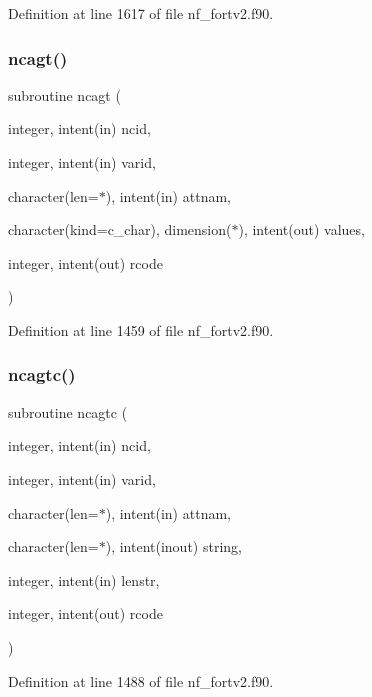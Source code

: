 Definition at line 1617 of file nf\+\_\+fortv2.\+f90.

\mbox{\label{nf__fortv2_8f90_a12c954aa7ec21768adf357a69850aa8e}} 
\subsubsection{\texorpdfstring{ncagt()}{ncagt()}}
{\footnotesize\ttfamily subroutine ncagt (\begin{DoxyParamCaption}\item[{integer, intent(in)}]{ncid,  }\item[{integer, intent(in)}]{varid,  }\item[{character(len=$\ast$), intent(in)}]{attnam,  }\item[{character(kind=c\+\_\+char), dimension($\ast$), intent(out)}]{values,  }\item[{integer, intent(out)}]{rcode }\end{DoxyParamCaption})}



Definition at line 1459 of file nf\+\_\+fortv2.\+f90.

\mbox{\label{nf__fortv2_8f90_acdffb4e9e53796cfadcf86a802a159b3}} 
\subsubsection{\texorpdfstring{ncagtc()}{ncagtc()}}
{\footnotesize\ttfamily subroutine ncagtc (\begin{DoxyParamCaption}\item[{integer, intent(in)}]{ncid,  }\item[{integer, intent(in)}]{varid,  }\item[{character(len=$\ast$), intent(in)}]{attnam,  }\item[{character(len=$\ast$), intent(inout)}]{string,  }\item[{integer, intent(in)}]{lenstr,  }\item[{integer, intent(out)}]{rcode }\end{DoxyParamCaption})}



Definition at line 1488 of file nf\+\_\+fortv2.\+f90.

